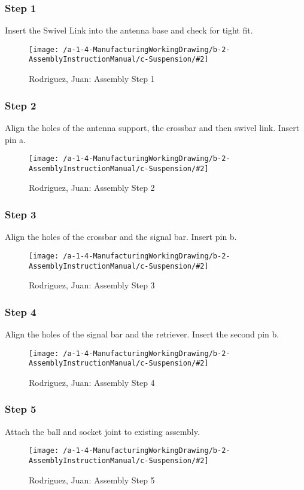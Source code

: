 \newcommand{\AssemblyManualSuspension}[3]{
\subsubsection{Step #1}
\begin{center}
#3
\begin{figure}[!ht]
\texttt{[image: /a-1-4-ManufacturingWorkingDrawing/b-2-AssemblyInstructionManual/c-Suspension/\#2]}
\caption{Rodriguez, Juan: Assembly Step #1}
\end{figure}
\end{center}
}
\AssemblyManualSuspension{1}{step1.jpeg}{
Insert the Swivel Link into the antenna base and check for tight fit.
}
\AssemblyManualSuspension{2}{step2.jpeg}{
Align the holes of the antenna support, the crossbar and then swivel link. Insert pin a.
}
\AssemblyManualSuspension{3}{step3.jpeg}{
Align the holes of the crossbar and the signal bar. Insert pin b.
}
\AssemblyManualSuspension{4}{step4.jpeg}{
Align the holes of the signal bar and the retriever. Insert the second pin b.
}
\AssemblyManualSuspension{5}{step5.jpeg}{
Attach the ball and socket joint to existing assembly.
}
